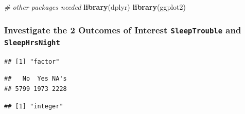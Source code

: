 \documentclass[]{article}
\newenvironment{Shaded}{\begin{snugshade}}{\end{snugshade}}
\newcommand{\KeywordTok}[1]{\textcolor[rgb]{0.13,0.29,0.53}{\textbf{{#1}}}}
\newcommand{\CommentTok}[1]{\textcolor[rgb]{0.56,0.35,0.01}{\textit{{#1}}}}
\newcommand{\NormalTok}[1]{{#1}}
\begin{document}
\begin{Shaded}
\begin{Highlighting}[]
\CommentTok{# other packages needed}
\KeywordTok{library}\NormalTok{(dplyr)}
\KeywordTok{library}\NormalTok{(ggplot2)}
\end{Highlighting}
\end{Shaded}

\subsubsection{\texorpdfstring{Investigate the 2 Outcomes of Interest
\texttt{SleepTrouble} and
\texttt{SleepHrsNight}}{Investigate the 2 Outcomes of Interest SleepTrouble and SleepHrsNight}}\label{investigate-the-2-outcomes-of-interest-sleeptrouble-and-sleephrsnight}

\begin{Shaded}
\end{Shaded}

\begin{verbatim}
## [1] "factor"
\end{verbatim}

\begin{Shaded}
\end{Shaded}

\begin{verbatim}
##   No  Yes NA's 
## 5799 1973 2228
\end{verbatim}

\begin{Shaded}
\end{Shaded}

\begin{verbatim}
## [1] "integer"
\end{verbatim}

\begin{Shaded}
\end{Shaded}
\end{document}
